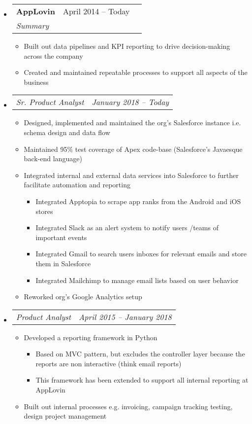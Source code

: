 \documentclass[draft]{article}
\newcommand{\resumeheading}[1]{
    \noindent
    \fcolorbox{mygrey}{mygrey}{%
        \parbox{\dimexpr\linewidth-2\fboxsep-2\fboxrule}{\large#1}}
}
\newcommand{\splitresumesubheading}[3]{
    \begin{tabularx}{\linewidth}{XcX}
	    	\textbf{#1} & #2 \\
		    \textit{#3}
    \end{tabularx}
    \vspace{-3ex}
}
\newcommand{\resumesubsubheading}[2]{
    \begin{tabularx}{\linewidth}{Xc}
		\textit{#1} & \textit{#2} \\
    \end{tabularx}
    \vspace{-4ex}
}
\newcommand{\resumeitem}[1]{
    \item #1 
    \vspace{-2pt}
}
\begin{document}
\resumeheading{Experience}
\begin{itemize}
    \item \splitresumesubheading{AppLovin}{April 2014 -- Today}
                                {Summary}
    \begin{itemize}
        \resumeitem{Built out data pipelines and KPI reporting to drive decision-making across the company}
        \resumeitem{Created and maintained repeatable processes to support all aspects of the business}
    \end{itemize}
    \item \resumesubsubheading{Sr. Product Analyst}{January 2018 -- Today}
    \begin{itemize}
        \resumeitem{Designed, implemented and maintained the org’s Salesforce instance i.e. schema design and data flow}
        \resumeitem{Maintained 95\% test coverage of Apex code-base (Salesforce's Javaesque back-end language)}
        \resumeitem{Integrated internal and external data services into Salesforce to further facilitate automation and reporting}
        \vspace{-3ex}
        \begin{itemize}
            \resumeitem{Integrated Apptopia to scrape app ranks from the Android and iOS stores}
            \resumeitem{Integrated Slack as an alert system to notify users /teams of important events}
            \resumeitem{Integrated Gmail to search users inboxes for relevant emails and store them in Salesforce}
            \resumeitem{Integrated Mailchimp to manage email lists based on user behavior}
        \end{itemize}
        \resumeitem{Reworked org’s Google Analytics setup}
    \end{itemize}
    \item \resumesubsubheading{Product Analyst}{April 2015 -- January 2018}
    \begin{itemize}
        \resumeitem{Developed a reporting framework in Python}
        \begin{itemize}
            \resumeitem{Based on MVC pattern, but excludes the controller layer because the reports are non interactive (think email reports)}
            \resumeitem{This framework has been extended to support all internal reporting at AppLovin}
        \end{itemize}
        \resumeitem{Built out internal processes e.g. invoicing, campaign tracking testing, design project management}
    \end{itemize}

\end{itemize}
\end{document}
